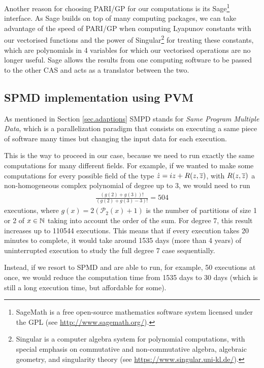 Another reason for choosing PARI/GP for our computations is its Sage\footnote{SageMath is a free open-source mathematics software system licensed under the GPL (see \url{http://www.sagemath.org/}).} interface. As Sage builds on top of many computing packages, we can take advantage of the speed of PARI/GP when computing Lyapunov constants with our vectorised functions and the power of Singular\footnote{Singular is a computer algebra system for polynomial computations, with special emphasis on commutative and non-commutative algebra, algebraic geometry, and singularity theory (see \url{https://www.singular.uni-kl.de/}).} for treating these constants, which are polynomials in 4 variables for which our vectorised operations are no longer useful. Sage allows the results from one computing software to be passed to the other CAS and acts as a translator between the two.





\subsection{SPMD implementation using PVM}

As mentioned in Section \ref{sec.adaptions} SMPD stands for \emph{Same Program Multiple Data}, which is a parallelization paradigm that consists on executing a same piece of software many times but changing the input data for each execution.

This is the way to proceed in our case, because we need to run exactly the same computations for many different fields. For example, if we wanted to make some computations  for every possible field of the type $\dot z=iz+R(z,\overline{z})$, with $R(z,\overline{z})$ a non-homogeneous complex polynomial of degree up to 3, we would need to run
\begin{align*}
\frac{(g(2)+g(3))!}{(g(2)+g(3)-3)!}=504
\end{align*}
executions, where $g(x)=2(\mathcal{P}_2(x)+1)$ is the number of partitions of size 1 or 2 of $x\in\mathbb{N}$ taking into account the order of the sum. For degree 7, this result increases up to 110544 executions. This means that if every execution takes 20 minutes to complete, it would take around 1535 days (more than 4 years) of uninterrupted execution to study the full degree 7 case sequentially.

Instead, if we resort to SPMD and are able to run, for example, 50 executions at once, we would reduce the computation time from 1535 days to 30 days (which is still a long execution time, but affordable for some).


